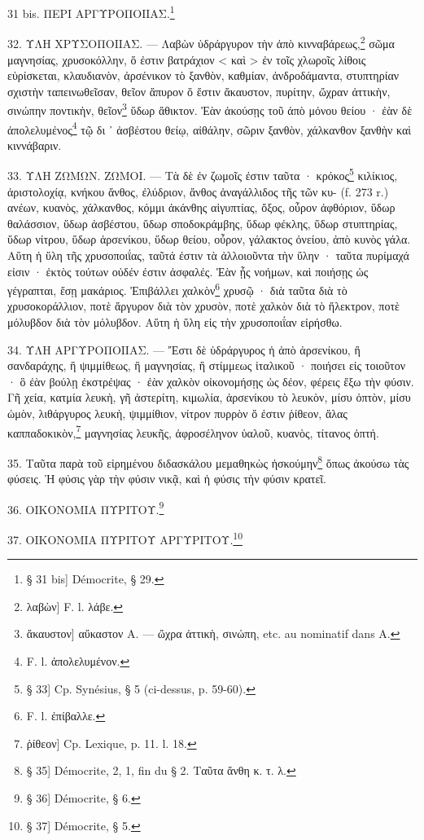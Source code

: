 \documentclass[a4paper, 11pt, oneside, polutonikogreek, french]{article}
\begin{document}
31 bis. ΠΕΡΙ ΑΡΓΥΡΟΠΟΙΙΑΣ.\footnote{§ 31 bis] Démocrite, § 29.}

32. ΥΛΗ ΧΡΥΣΟΠΟΙΙΑΣ. --- Λαβὼν ὑδράργυρον τὴν ἀπὸ κινναβάρεως,\footnote{λαβὼν] F. l. λάβε.} σῶμα μαγνησίας, χρυσοκόλλην, ὅ ἐστιν βατράχιον < καὶ > ἐν τοῖς χλωροῖς λίθοις εὑρίσκεται, κλαυδιανὸν, ἀρσένικον τὸ ξανθὸν, καθμίαν, ἀνδροδάμαντα, στυπτηρίαν σχιστὴν ταπεινωθεῖσαν, θεῖον ἄπυρον ὅ ἔστιν ἄκαυστον, πυρίτην, ὤχραν ἀττικὴν, σινώπην ποντικὴν, θεῖον\footnote{ἄκαυστον] αὔκαστον A. --- ὤχρα ἀττικὴ, σινώπη, etc. au nominatif dans A.} ὕδωρ ἄθικτον. Ἐὰν ἀκούσῃς τοῦ ἀπὸ μόνου θείου · ἐὰν δὲ ἀπολελυμένος\footnote{F. l. ἀπολελυμένον.} τῷ δι ᾽ ἀσβέστου θείῳ, αἰθάλην, σῶριν ξανθὸν, χάλκανθον ξανθὴν καὶ κιννάβαριν.

33. ΥΛΗ ΖΩΜΩΝ. ΖΩΜΟΙ. --- Τὰ δὲ ἐν ζωμοῖς ἐστιν ταῦτα · κρόκος\footnote{§ 33] Cp. Synésius, § 5 (ci-dessus, p. 59-60).} κιλίκιος, ἀριστολοχίᾳ, κνήκου ἄνθος, ἐλύδριον, ἄνθος ἀναγάλλιδος τῆς τῶν κυ- (f. 273 r.) ανέων, κυανὸς, χάλκανθος, κόμμι ἀκάνθης αἰγυπτίας, ὄξος, οὖρον ἀφθόριον, ὕδωρ θαλάσσιον, ὕδωρ ἀσβέστου, ὕδωρ σποδοκράμβης, ὕδωρ φέκλης, ὕδωρ στυπτηρίας, ὕδωρ νίτρου, ὕδωρ ἀρσενίκου, ὕδωρ θείου, οὖρον, γάλακτος ὀνείου, ἀπὸ κυνὸς γάλα. Αὕτη ἡ ὕλη τῆς χρυσοποιΐας, ταῦτά ἐστιν τὰ ἀλλοιοῦντα τὴν ὕλην · ταῦτα πυρίμαχά εἰσιν · ἐκτὸς τούτων οὐδέν ἐστιν ἀσφαλές. Ἐὰν ᾖς νοήμων, καὶ ποιήσῃς ὡς γέγραπται, ἔσῃ μακάριος. Ἐπιβάλλει χαλκὸν\footnote{F. l. ἐπίβαλλε.} χρυσῷ · διὰ ταῦτα διὰ τὸ χρυσοκοράλλιον, ποτὲ ἄργυρον διὰ τὸν χρυσὸν, ποτὲ χαλκὸν διὰ τὸ ἤλεκτρον, ποτὲ μόλυβδον διὰ τὸν μόλυβδον. Αὕτη ἡ ὕλη εἰς τὴν χρυσοποιΐαν εἰρήσθω.

34. ΥΛΗ ΑΡΓΥΡΟΠΟΙΙΑΣ. --- Ἔστι δὲ ὑδράργυρος ἡ ἀπὸ ἀρσενίκου, ἢ σανδαράχης, ἢ ψιμμίθεως, ἢ μαγνησίας, ἢ στίμμεως ἰταλικοῦ · ποιήσει εἰς τοιοῦτον · ὃ ἐὰν βούλῃ ἐκστρέψας · ἐὰν χαλκὸν οἰκονομήσῃς ὡς δέον, φέρεις ἔξω τὴν φύσιν. Γῆ χεία, κατμία λευκὴ, γῆ ἀστερίτη, κιμωλία, ἀρσενίκου τὸ λευκὸν, μίσυ ὀπτὸν, μίσυ ὠμὸν, λιθάργυρος λευκὴ, ψιμμίθιον, νίτρον πυρρὸν ὅ ἐστιν ῥίθεον, ἅλας καππαδοκικὸν,\footnote{ῥίθεον] Cp. Lexique, p. 11. l. 18.} μαγνησίας λευκῆς, ἀφροσέληνον ὑαλοῦ, κυανὸς, τίτανος ὀπτή.

35. Ταῦτα παρὰ τοῦ εἰρημένου διδασκάλου μεμαθηκὼς ἠσκούμην\footnote{§ 35] Démocrite, 2, 1, fin du § 2. Tαῦτα ἄνθη κ. τ. λ.} ὅπως ἀκούσω τὰς φύσεις. Ἡ φύσις γὰρ τὴν φύσιν νικᾷ, καὶ ἡ φύσις τὴν φύσιν κρατεῖ.

36. ΟΙΚΟΝΟΜΙΑ ΠΥΡΙΤΟΥ.\footnote{§ 36] Démocrite, § 6.}

37. ΟΙΚΟΝΟΜΙΑ ΠΥΡΙΤΟΥ ΑΡΓΥΡΙΤΟΥ.\footnote{§ 37] Démocrite, § 5.}
\end{document}
